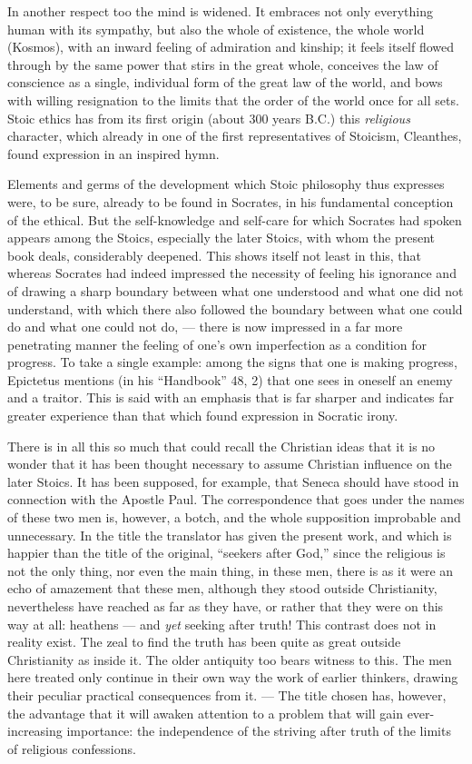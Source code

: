 \documentclass[12pt,a4paper,openany]{book}
\newcommand{\opage}[1]{\marginnote{\footnotesize\textit{[#1]}}}
\begin{document}
In another respect too the mind is widened. It
embraces not only everything human with its sympathy, but
also the whole of existence, the whole world (Kosmos), with an inward
feeling of admiration and kinship; it feels itself
flowed through by the same power that stirs in the great whole,
conceives the law of conscience as a single, individual form
of the great law of the world, and bows with willing
resignation to the limits that the order of the world once for all sets.
Stoic ethics has from its first origin (about 300
years B.C.) this \emph{religious} character, which already in one of
the first representatives of Stoicism, Cleanthes, found expression in
an inspired hymn.

Elements and germs of the development which Stoic
philosophy thus expresses were, to be sure, already to be found
in Socrates, in his fundamental conception of the ethical.
But the self-knowledge and self-care for which Socrates had
spoken appears among the Stoics, especially the
later Stoics, with whom the present book deals,
considerably deepened. This shows itself not least in this, that whereas
Socrates had indeed impressed the necessity of feeling his
ignorance and of drawing a sharp boundary between what
\opage{161}one understood and what one did not understand, with which there also followed
the boundary between what one could do and what one could
not do, --- there is now impressed in a far more penetrating
manner the feeling of one's own imperfection as a condition for
progress. To take a single example: among the signs
that one is making progress, Epictetus mentions (in his ``Handbook''
48, 2) that one sees in oneself an enemy and a traitor. This
is said with an emphasis that is far sharper and indicates
far greater experience than that which found expression in
Socratic irony.

There is in all this so much that could recall
the Christian ideas that it is no wonder that it
has been thought necessary to assume Christian influence on the
later Stoics. It has been supposed, for example, that Seneca should have
stood in connection with the Apostle Paul. The
correspondence that goes under the names of these two men is, however, a
botch, and the whole supposition improbable and unnecessary.
In the title the translator has given the present work,
and which is happier than the title of the original, ``seekers after God,''
since the religious is not the only thing, nor even
the main thing, in these men, there is as it were an echo of
amazement that these men, although they stood outside
Christianity, nevertheless have reached as far as they have, or rather
that they were on this way at all: heathens
--- and \emph{yet} seeking after truth! This contrast does not in
reality exist. The zeal to find the truth
has been quite as great outside Christianity as inside
it. The older antiquity too bears witness to this. The men
here treated only continue in their own way the work of earlier
thinkers, drawing their peculiar practical
consequences from it. --- The title chosen has, however, the advantage that
it will awaken attention to a problem that will gain
ever-increasing importance: the independence of the striving after truth
of the limits of religious confessions.
\end{document}
